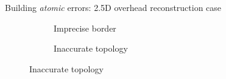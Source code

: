 \documentclass[export]{beamer}
\begin{document}
\begin{frame}{Building \textit{atomic} errors: 2.5D overhead reconstruction case}
\begin{figure}
\begin{center}
\begin{subfigure}{.28\textwidth}
                    \end{subfigure}
                    \hspace{10pt}
                    \begin{subfigure}{.28\textwidth}
                        \caption{\label{fig::bul_footprint} Imprecise border}
                    \end{subfigure}
                    \hspace{10pt}
                    \begin{subfigure}{.28\textwidth}
                        \caption{\label{fig::bul_height} Inaccurate topology}
                    \end{subfigure}
                \end{center}
            \end{figure}
        \end{frame}
\end{document}
